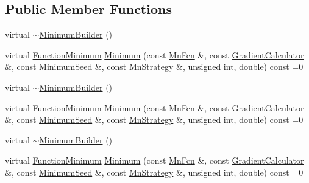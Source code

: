 \subsection*{Public Member Functions}
\begin{DoxyCompactItemize}
\item 
virtual \mbox{\hyperlink{classROOT_1_1Minuit2_1_1MinimumBuilder_acb3f2fd5c8483b62c44e042742ca3d88}{$\sim$\+Minimum\+Builder}} ()
\item 
virtual \mbox{\hyperlink{classROOT_1_1Minuit2_1_1FunctionMinimum}{Function\+Minimum}} \mbox{\hyperlink{classROOT_1_1Minuit2_1_1MinimumBuilder_aefaa624436afa8195af1f3393a35981f}{Minimum}} (const \mbox{\hyperlink{classROOT_1_1Minuit2_1_1MnFcn}{Mn\+Fcn}} \&, const \mbox{\hyperlink{classROOT_1_1Minuit2_1_1GradientCalculator}{Gradient\+Calculator}} \&, const \mbox{\hyperlink{classROOT_1_1Minuit2_1_1MinimumSeed}{Minimum\+Seed}} \&, const \mbox{\hyperlink{classROOT_1_1Minuit2_1_1MnStrategy}{Mn\+Strategy}} \&, unsigned int, double) const =0
\item 
virtual \mbox{\hyperlink{classROOT_1_1Minuit2_1_1MinimumBuilder_acb3f2fd5c8483b62c44e042742ca3d88}{$\sim$\+Minimum\+Builder}} ()
\item 
virtual \mbox{\hyperlink{classROOT_1_1Minuit2_1_1FunctionMinimum}{Function\+Minimum}} \mbox{\hyperlink{classROOT_1_1Minuit2_1_1MinimumBuilder_aefaa624436afa8195af1f3393a35981f}{Minimum}} (const \mbox{\hyperlink{classROOT_1_1Minuit2_1_1MnFcn}{Mn\+Fcn}} \&, const \mbox{\hyperlink{classROOT_1_1Minuit2_1_1GradientCalculator}{Gradient\+Calculator}} \&, const \mbox{\hyperlink{classROOT_1_1Minuit2_1_1MinimumSeed}{Minimum\+Seed}} \&, const \mbox{\hyperlink{classROOT_1_1Minuit2_1_1MnStrategy}{Mn\+Strategy}} \&, unsigned int, double) const =0
\item 
virtual \mbox{\hyperlink{classROOT_1_1Minuit2_1_1MinimumBuilder_acb3f2fd5c8483b62c44e042742ca3d88}{$\sim$\+Minimum\+Builder}} ()
\item 
virtual \mbox{\hyperlink{classROOT_1_1Minuit2_1_1FunctionMinimum}{Function\+Minimum}} \mbox{\hyperlink{classROOT_1_1Minuit2_1_1MinimumBuilder_aefaa624436afa8195af1f3393a35981f}{Minimum}} (const \mbox{\hyperlink{classROOT_1_1Minuit2_1_1MnFcn}{Mn\+Fcn}} \&, const \mbox{\hyperlink{classROOT_1_1Minuit2_1_1GradientCalculator}{Gradient\+Calculator}} \&, const \mbox{\hyperlink{classROOT_1_1Minuit2_1_1MinimumSeed}{Minimum\+Seed}} \&, const \mbox{\hyperlink{classROOT_1_1Minuit2_1_1MnStrategy}{Mn\+Strategy}} \&, unsigned int, double) const =0
\end{DoxyCompactItemize}


